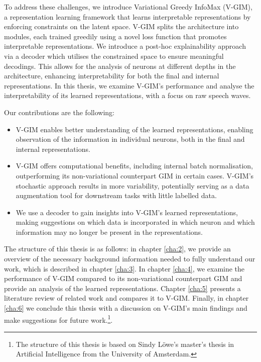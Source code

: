 To address these challenges, we introduce Variational Greedy InfoMax (V-GIM), a representation learning framework that learns interpretable representations by enforcing constraints on the latent space. V-GIM splits the architecture into modules, each trained greedily using a novel loss function that promotes interpretable representations. We introduce a post-hoc explainability approach via a decoder which utilises the constrained space to ensure meaningful decodings. This allows for the analysis of neurons at different depths in the architecture, enhancing interpretability for both the final and internal representations. In this thesis, we examine V-GIM's performance and analyse the interpretability of its learned representations, with a focus on raw speech waves.



Our contributions are the following:
\begin{itemize}
	\item V-GIM enables better understanding of the learned representations, enabling observation of the information in individual neurons, both in the final and internal representations. %
	\item V-GIM offers computational benefits, including internal batch normalisation, outperforming its non-variational counterpart GIM in certain cases. V-GIM's stochastic approach results in more variability, potentially serving as a data augmentation tool for downstream tasks with little labelled data.
	\item We use a decoder to gain insights into V-GIM's learned representations, making suggestions on which data is incorporated in which neuron and which information may no longer be present in the representations.
\end{itemize}




The structure of this thesis is as follows: in chapter \ref{cha:2}, we provide an overview of the necessary background information needed to fully understand our work, which is described in chapter \ref{cha:3}. In chapter \ref{cha:4}, we examine the performance of V-GIM compared to its non-variational counterpart GIM and provide an analysis of the learned representations. Chapter \ref{cha:5} presents a literature review of related work and compares it to V-GIM. Finally, in chapter \ref{cha:6} we conclude this thesis with a discussion on V-GIM's main findings and make suggestions for future work.\footnote{The structure of this thesis is based on Sindy Löwe's master's thesis in Artificial Intelligence from the University of Amsterdam.}. 



